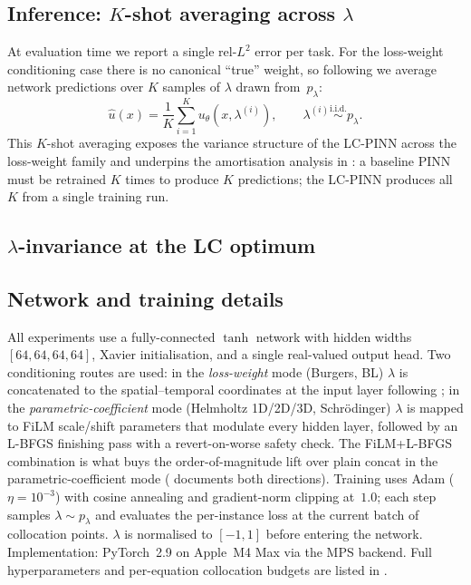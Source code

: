 \subsection{Inference: $K$-shot averaging across $\lambda$}
\label{sec:k-shot}

At evaluation time we report a single rel-$L^2$ error per task. For
the loss-weight conditioning case there is no canonical ``true''
weight, so following \citet{dosovitskiy2020} we average network
predictions over $K$ samples of $\lambda$ drawn from~$p_\lambda$:
\begin{equation}
   \hat u(x) = \frac{1}{K}\sum_{i=1}^{K} u_\theta(x, \lambda^{(i)}),
   \qquad \lambda^{(i)} \stackrel{\text{i.i.d.}}{\sim} p_\lambda .
\label{eq:k-shot}
\end{equation}
This $K$-shot averaging exposes the variance structure of the
LC-PINN across the loss-weight family and underpins the amortisation
analysis in : a baseline PINN must be retrained
$K$ times to produce $K$ predictions; the LC-PINN produces all $K$
from a single training run.

\subsection{$\lambda$-invariance at the LC optimum}



\subsection{Network and training details}
\label{sec:training-details}

All experiments use a fully-connected $\tanh$ network with hidden
widths $[64, 64, 64, 64]$, Xavier initialisation, and a single
real-valued output head. Two conditioning routes are used: in the
\emph{loss-weight} mode (Burgers, BL) $\lambda$ is concatenated to
the spatial--temporal coordinates at the input layer following
\citet{dosovitskiy2020}; in the \emph{parametric-coefficient} mode
(Helmholtz 1D/2D/3D, Schrödinger) $\lambda$ is mapped to FiLM
\citep{perez2018film} scale/shift parameters that modulate every
hidden layer, followed by an L-BFGS finishing pass with a
revert-on-worse safety check. The FiLM+L-BFGS combination is what
buys the order-of-magnitude lift over plain concat in the
parametric-coefficient mode (
documents both directions). Training uses Adam
($\eta = 10^{-3}$) with cosine annealing and gradient-norm clipping
at~$1.0$; each step samples $\lambda \sim p_\lambda$ and evaluates
the per-instance loss at the current batch of collocation points.
$\lambda$ is normalised to $[-1, 1]$ before entering the network.
Implementation: PyTorch~2.9 on Apple~M4 Max via the MPS backend.
Full hyperparameters and per-equation collocation budgets are listed
in .
